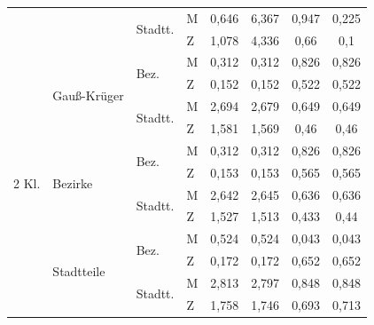 \documentclass{Vorlage}
\begin{document}
\begin{table}[h]
\begin{tabular}{llll|cc|cc}
                        &                               & \multirow{2}{*}{Stadtt.} & M & 0,646       & 6,367       &   0,947           &   0,225  \\
                        &                               &                          & Z & 1,078        & 4,336       &   0,66           &                0,1 \\ \hline
\multirow{12}{*}{2 Kl.}  & \multirow{4}{*}{Gauß-Krüger} & \multirow{2}{*}{Bez.}   & M & 0,312      & 0,312      &     0,826           &  0,826
 \\
                        &                               &                          & Z & 0,152      & 0,152      &   0,522           &  0,522     \\ \cline{3-8} 
                        &                               & \multirow{2}{*}{Stadtt.} & M & 2,694       & 2,679     &   0,649          &  0,649   \\
                        &                               &                          & Z & 1,581       & 1,569      &  0,46            &   0,46   \\ \cline{2-8} 
                        & \multirow{4}{*}{Bezirke}      & \multirow{2}{*}{Bez.}    & M & 0,312       & 0,312      &  0,826            &   0,826    \\
                        &                               &                          & Z & 0,153       & 0,153      &  0,565            &  0,565    \\ \cline{3-8} 
                        &                               & \multirow{2}{*}{Stadtt.} & M & 2,642       & 2,645      &  0,636           &   0,636    \\
                        &                               &                          & Z & 1,527       & 1,513    &  0,433            &    0,44   
\\ \cline{2-8} 
                        & \multirow{4}{*}{Stadtteile}   & \multirow{2}{*}{Bez.}    & M & 0,524       & 0,524      &   0,043          &    0,043 \\
                        &                               &                          & Z & 0,172       & 0,172      &     0,652        &     0,652 \\ \cline{3-8} 
                        &                               & \multirow{2}{*}{Stadtt.} & M & 2,813        &  2,797      &  0,848     &  0,848 \\
                        &                               &                          & Z & 1,758        & 1,746     &    0,693     &     0,713
                         \\ \hline \hline
\end{tabular}
\end{table}
\end{document}
